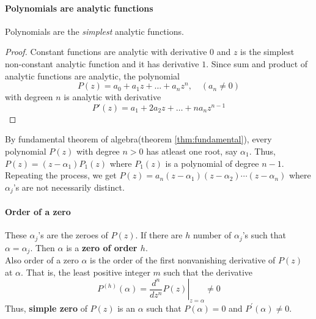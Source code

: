 \paragraph{Polynomials are analytic functions}
Polynomials are the \textit{simplest} analytic functions.
\begin{proof}
Constant functions are analytic with derivative $0$ and $z$ is the simplest non-constant analytic function and it has derivative $1$.
Since sum and product of analytic functions are analytic, the polynomial
\begin{equation}
	P(z) = a_0 + a_1 z + \dots + a_nz^n,\quad (a_n \ne 0)
\end{equation}
with degreen $n$ is analytic with derivative
\begin{equation}
	P'(z) = a_1 + 2a_2z + \dots + na_nz^{n-1}
\end{equation}
\end{proof}

By fundamental theorem of algebra(theorem \ref{thm:fundamental}), every polynomial $P(z)$ with degree $n > 0$ has atleast one root, say $\alpha_1$.
Thus, $P(z) = (z-\alpha_1)P_1(z)$ where $P_1(z)$ is a polynomial of degree $n-1$.
Repeating the process, we get $P(z) = a_n(z-\alpha_1)(z-\alpha_2) \dotsm (z-\alpha_n)$ where $\alpha_j$'s are not necessarily distinct.\\

\paragraph{Order of a zero}
These $\alpha_j$'s are the zeroes of $P(z)$.
If there are $h$ number of $\alpha_j$'s such that $\alpha = \alpha_j$. Then $\alpha$ is a \textbf{zero of order $h$}.\\

Also order of a zero $\alpha$ is the order of the first nonvanishing derivative of $P(z)$ at $\alpha$.
That is, the least positive integer $m$ such that the derivative \[ P^{(h)}(\alpha) = \left.\frac{d^n}{dz^n}P(z)\right|_{z=\alpha} \ne 0 \]
Thus, \textbf{simple zero} of $P(z)$ is an $\alpha$ such that $P(\alpha) = 0$ and $P^\prime(\alpha) \ne 0$.

